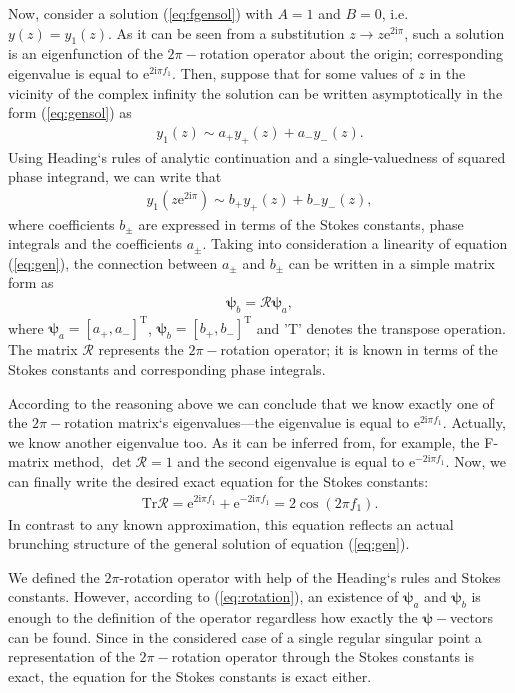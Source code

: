 \documentclass{ws-m3as}
\def\rmi{\mathrm{i}}
\def\rme{\mathrm{e}}
\def\psii{\bm{\psi}}
\def\R{\bm{\mathcal{R}}}
\def\T{\mathrm{T}}
\def\Tr{\mathrm{Tr}}
\newcommand\eref[1]{(\ref{#1})}
\begin{document}
Now, consider a solution \eref{eq:fgensol} with $A=1$ and $B=0$, i.e. $y(z)=y_1(z)$. 
As it can be seen from a substitution \mbox{$z \rightarrow z \rme^{2 \rmi \pi}$}, 
such a solution is an eigenfunction of the $2\pi-$rotation operator about the origin; 
corresponding eigenvalue is equal to $\rme^{2 \rmi \pi f_1}$.  
Then, suppose that for some values of $z$ in the vicinity of the complex infinity 
the solution can be written asymptotically in the form \eref{eq:gensol} as
\begin{eqnarray}
y_1(z) \sim a_+y_+(z) + a_-y_-(z).
\end{eqnarray}
Using Heading`s rules of analytic continuation\cite{heading,rwbook} and a single-valuedness 
of squared phase integrand, we can write that
\begin{eqnarray}
y_1(z \rme^{2 \rmi \pi}) \sim b_+y_+(z) + b_-y_-(z),
\end{eqnarray}
where coefficients $b_{\pm}$ are expressed in terms of the Stokes constants, phase integrals and 
the coefficients $a_{\pm}$. Taking into consideration a linearity of equation \eref{eq:gen}, 
the connection between $a_{\pm}$ and $b_{\pm}$ can be written in a simple matrix form as
\begin{eqnarray}
\psii_b = \R \psii_a,
\label{eq:rotation}
\end{eqnarray}
where $\psii_a = [{a_+,a_-}]^{\T}$, $\psii_b = [{b_+,b_-}]^{\T}$ and 'T' denotes the transpose operation.
The matrix $\R$ represents the $2\pi-$rotation operator; it is known in terms of
the Stokes constants and corresponding phase integrals. 

According to the reasoning above we can conclude
that we know exactly one of the $2\pi-$rotation matrix`s eigenvalues---the eigenvalue is 
equal to $\rme^{2 \rmi \pi f_1}$. Actually, we know another eigenvalue too. 
As it can be inferred from, for example, the F-matrix method\cite{frbook}, $\det\R=1$ and the second eigenvalue is equal 
to $\rme^{-2 \rmi \pi f_1}$. Now, we can finally write the desired exact equation for the Stokes constants:
\begin{eqnarray}
\Tr\R = \rme^{2 \rmi \pi f_1} + \rme^{-2 \rmi \pi f_1} = 2 \cos(2 \pi f_1).
\label{eq:main}
\end{eqnarray}
In contrast to any known approximation, this equation reflects an actual brunching structure 
of the general solution of equation \eref{eq:gen}. 

We defined the $2\pi$-rotation operator with help of the Heading`s rules and Stokes constants. However, 
according to \eref{eq:rotation}, an existence of $\psii_a$ and $\psii_b$ is enough to the definition of
the operator regardless how exactly the $\psii-$vectors can be found. Since in the considered case of a 
single regular singular point a representation of the $2\pi-$rotation operator through the Stokes constants 
is exact, the equation for the Stokes constants is exact either. 
\end{document}

